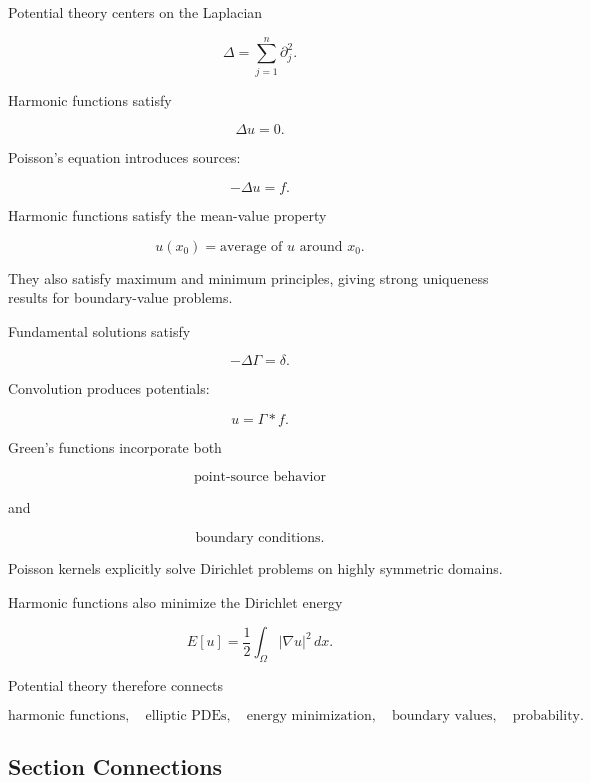 Potential theory centers on the Laplacian

\[
\boxed{
\Delta
=
\sum_{j=1}^{n}\partial_j^2.
}
\]

Harmonic functions satisfy

\[
\boxed{
\Delta u=0.
}
\]

Poisson's equation introduces sources:

\[
\boxed{
-\Delta u=f.
}
\]

Harmonic functions satisfy the mean-value property

\[
\boxed{
u(x_0)
=
\text{average of \(u\) around \(x_0\)}.
}
\]

They also satisfy maximum and minimum principles, giving strong uniqueness
results for boundary-value problems.

Fundamental solutions satisfy

\[
\boxed{
-\Delta\Gamma=\delta.
}
\]

Convolution produces potentials:

\[
\boxed{
u=\Gamma*f.
}
\]

Green's functions incorporate both

\[
\boxed{
\text{point-source behavior}
}
\]

and

\[
\boxed{
\text{boundary conditions}.
}
\]

Poisson kernels explicitly solve Dirichlet problems on highly symmetric
domains.

Harmonic functions also minimize the Dirichlet energy

\[
\boxed{
E[u]
=
\frac12
\int_\Omega|\nabla u|^2\,dx.
}
\]

Potential theory therefore connects

\[
\boxed{
\text{harmonic functions},
\quad
\text{elliptic PDEs},
\quad
\text{energy minimization},
\quad
\text{boundary values},
\quad
\text{probability}.
}
\]

\subsection{Section Connections}
\label{subsec:potential-theory-connections}

